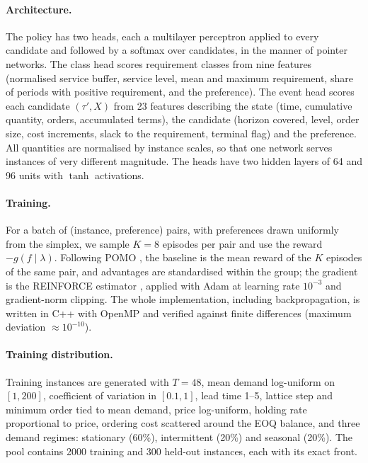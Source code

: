 \documentclass[preprint,12pt,authoryear]{elsarticle}
\begin{document}
\paragraph{Architecture.}
The policy has two heads, each a multilayer perceptron applied to every candidate and followed by
a softmax over candidates, in the manner of pointer networks. The class head scores requirement
classes from nine features (normalised service buffer, service level, mean and maximum
requirement, share of periods with positive requirement, and the preference). The event head
scores each candidate $(\tau',X)$ from 23 features describing the state (time, cumulative
quantity, orders, accumulated terms), the candidate (horizon covered, level, order size, cost
increments, slack to the requirement, terminal flag) and the preference. All quantities are
normalised by instance scales, so that one network serves instances of very different magnitude.
The heads have two hidden layers of 64 and 96 units with $\tanh$ activations.

\paragraph{Training.}
For a batch of (instance, preference) pairs, with preferences drawn uniformly from the simplex,
we sample $K=8$ episodes per pair and use the reward $-g(f\mid\lambda)$. Following POMO
\citep{Kwon2020POMO,Lin2022PSL}, the baseline is the mean reward of the $K$ episodes of the same
pair, and advantages are standardised within the group; the gradient is the REINFORCE estimator
\citep{Williams1992}, applied with Adam \citep{KingmaBa2015} at learning rate $10^{-3}$ and
gradient-norm clipping. The whole implementation, including backpropagation, is written in C++
with OpenMP and verified against finite differences (maximum deviation $\approx10^{-10}$).

\paragraph{Training distribution.}
Training instances are generated with $T=48$, mean demand log-uniform on $[1,200]$, coefficient
of variation in $[0.1,1]$, lead time 1--5, lattice step and minimum order tied to mean demand,
price log-uniform, holding rate proportional to price, ordering cost scattered around the EOQ
balance, and three demand regimes: stationary (60\%), intermittent (20\%) and seasonal (20\%).
The pool contains 2000 training and 300 held-out instances, each with its exact front.
\end{document}
